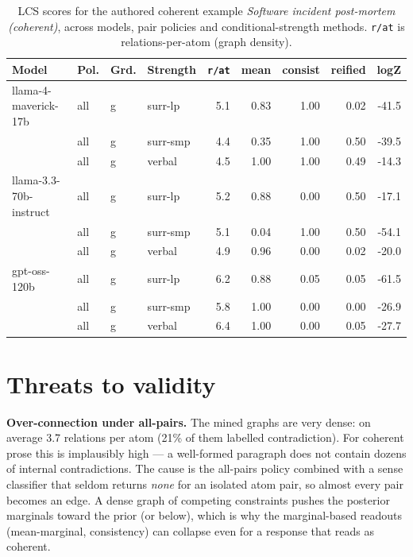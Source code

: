 \documentclass[11pt]{article}
\begin{document}
\begin{table}[htbp]
\centering
\footnotesize
\setlength{\tabcolsep}{4pt}
\caption{LCS scores for the authored coherent example \emph{Software incident post-mortem (coherent)}, across models, pair policies and conditional-strength methods. \texttt{r/at} is relations-per-atom (graph density).}
\label{tab:coherent}
\begin{tabular}{llllrrrrr}
\toprule
\textbf{Model} & \textbf{Pol.} & \textbf{Grd.} & \textbf{Strength} & \texttt{r/at} & mean & consist & reified & logZ \\
\midrule
llama-4-maverick-17b & all & g & surr-lp & 5.1 & 0.83 & 1.00 & 0.02 & -41.5 \\
 & all & g & surr-smp & 4.4 & 0.35 & 1.00 & 0.50 & -39.5 \\
 & all & g & verbal & 4.5 & 1.00 & 1.00 & 0.49 & -14.3 \\
\midrule
llama-3.3-70b-instruct & all & g & surr-lp & 5.2 & 0.88 & 0.00 & 0.50 & -17.1 \\
 & all & g & surr-smp & 5.1 & 0.04 & 1.00 & 0.50 & -54.1 \\
 & all & g & verbal & 4.9 & 0.96 & 0.00 & 0.02 & -20.0 \\
\midrule
gpt-oss-120b & all & g & surr-lp & 6.2 & 0.88 & 0.05 & 0.05 & -61.5 \\
 & all & g & surr-smp & 5.8 & 1.00 & 0.00 & 0.00 & -26.9 \\
 & all & g & verbal & 6.4 & 1.00 & 0.00 & 0.05 & -27.7 \\
\bottomrule
\end{tabular}
\end{table}


\section{Threats to validity}

\textbf{Over-connection under all-pairs.} The mined graphs are very dense: on average 3.7 relations per atom (21\% of them labelled contradiction). For coherent prose this is implausibly high --- a well-formed paragraph does not contain dozens of internal contradictions. The cause is the all-pairs policy combined with a sense classifier that seldom returns \emph{none} for an isolated atom pair, so almost every pair becomes an edge. A dense graph of competing constraints pushes the posterior marginals toward the prior (or below), which is why the marginal-based readouts (mean-marginal, consistency) can collapse even for a response that reads as coherent.
\end{document}
